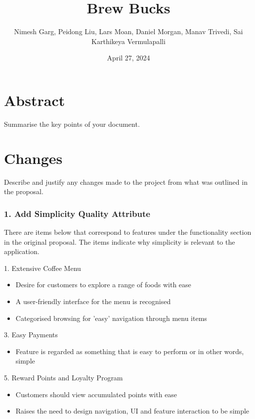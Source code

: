\documentclass{article}
\title{Brew Bucks}
\author{Nimesh Garg, Peidong Liu, Lars Moan, Daniel Morgan, Manav Trivedi, Sai Karthikeya Vermulapalli}
\date{April 27, 2024}
\begin{document}
\maketitle
\pagebreak

\tableofcontents
\pagebreak

\section{Abstract}
Summarise the key points of your document.
\section{Changes}
Describe and justify any changes made to the project from what was outlined in the proposal.

\subsubsection*{1. Add Simplicity Quality Attribute}
There are items below that correspond to features under the functionality section in the original proposal. The items indicate why simplicity is relevant to the application.

\medskip \begin{minipage}{\dimexpr\textwidth-0.25cm}
1. Extensive Coffee Menu 
\begin{itemize}
    \item Desire for customers to explore a range of foods with ease
    \item A user-friendly interface for the menu is recognised
    \item Categorised browsing for 'easy' navigation through menu items
\end{itemize}

3. Easy Payments
\begin{itemize}
    \item Feature is regarded as something that is easy to perform or in other words, simple
\end{itemize}

5. Reward Points and Loyalty Program
\begin{itemize}
    \item Customers should view accumulated points with ease
    \item Raises the need to design navigation, UI and feature interaction to be simple
\end{itemize}
\end{minipage}
\end{document}
